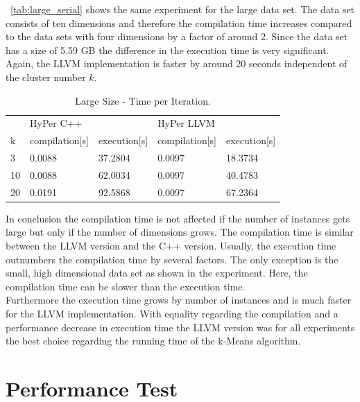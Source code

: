 ~\autoref{tab:large_serial} shows the same experiment for the large data set. The data set consists of ten dimensions and therefore the compilation time increases compared to the data sets with four dimensions by a factor of around 2. Since the data set has a size of 5.59 GB the difference in the execution time is very significant. Again, the LLVM implementation is faster by around 20 seconds independent of the cluster number $k$.



\begin{table}[htsb]
  \caption[Large Size - Time per Iteration]{Large Size - Time per Iteration.}
  \label{tab:large_serial}
  \centering
  \begin{tabular}{l l l l l}
    \toprule
      & HyPer C++ & & HyPer LLVM & \\
      k & compilation[s] & execution[s] & compilation[s] & execution[s] \\
    \midrule
      3  & 0.0088 & 37.2804 & 0.0097 & 18.3734 \\
      10 & 0.0088 & 62.0034 & 0.0097 & 40.4783 \\
      20 & 0.0191 & 92.5868 & 0.0097 & 67.2364 \\
    \bottomrule
  \end{tabular}
\end{table}


In conclusion the compilation time is not affected if the number of instances gets large but only if the number of dimensions grows. The compilation time is similar between the LLVM version and the C++ version. Usually, the execution time outnumbers the compilation time by several factors. The only exception is the small, high dimensional data set as shown in the experiment. Here, the compilation time can be slower than the execution time.
\\
Furthermore the execution time grows by number of instances and is much faster for the LLVM implementation. With equality regarding the compilation and a performance decrease in execution time the LLVM version was for all experiments the best choice regarding the running time of the k-Means algorithm.


\section{Performance Test}

